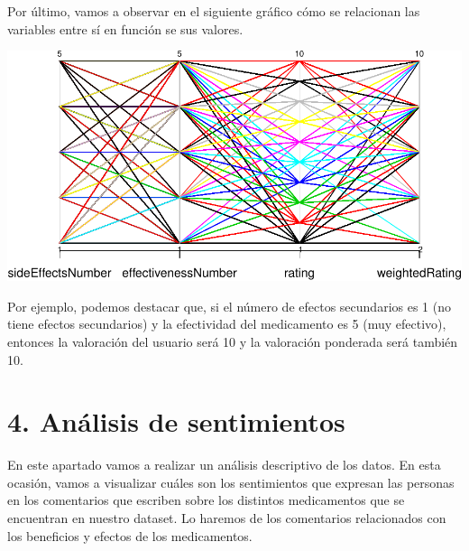 \documentclass[spanish,]{article}
\newenvironment{Shaded}{\begin{snugshade}}{\end{snugshade}}
\newcommand{\KeywordTok}[1]{\textcolor[rgb]{0.13,0.29,0.53}{\textbf{#1}}}
\newcommand{\DataTypeTok}[1]{\textcolor[rgb]{0.13,0.29,0.53}{#1}}
\newcommand{\DecValTok}[1]{\textcolor[rgb]{0.00,0.00,0.81}{#1}}
\newcommand{\CommentTok}[1]{\textcolor[rgb]{0.56,0.35,0.01}{\textit{#1}}}
\newcommand{\OperatorTok}[1]{\textcolor[rgb]{0.81,0.36,0.00}{\textbf{#1}}}
\newcommand{\NormalTok}[1]{#1}
\begin{document}
Por último, vamos a observar en el siguiente gráfico cómo se relacionan
las variables entre sí en función se sus valores.

\begin{Shaded}
\end{Shaded}

\includegraphics{practica-original_files/figure-latex/unnamed-chunk-121-1.pdf}

Por ejemplo, podemos destacar que, si el número de efectos secundarios
es 1 (no tiene efectos secundarios) y la efectividad del medicamento es
5 (muy efectivo), entonces la valoración del usuario será 10 y la
valoración ponderada será también 10.

\newpage

\section{4. Análisis de sentimientos}\label{analisis-de-sentimientos}

En este apartado vamos a realizar un análisis descriptivo de los datos.
En esta ocasión, vamos a visualizar cuáles son los sentimientos que
expresan las personas en los comentarios que escriben sobre los
distintos medicamentos que se encuentran en nuestro dataset. Lo haremos
de los comentarios relacionados con los beneficios y efectos de los
medicamentos.
\end{document}
